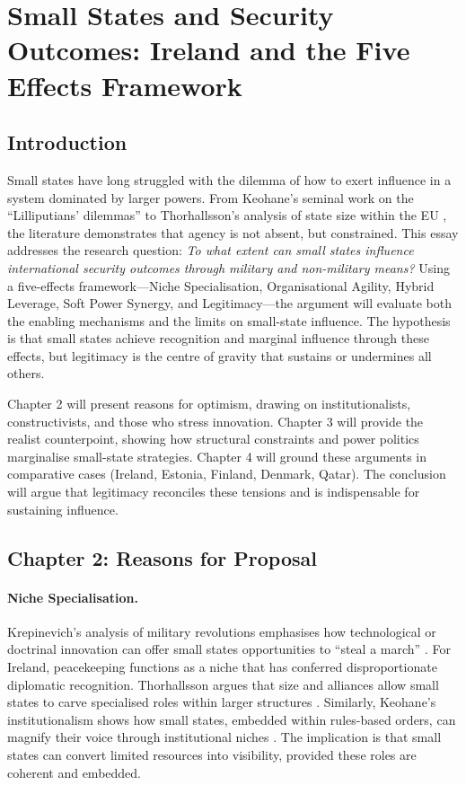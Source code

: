 \section*{Small States and Security Outcomes: Ireland and the Five Effects Framework}

\subsection*{Introduction}
Small states have long struggled with the dilemma of how to exert influence in a system dominated by larger powers. From Keohane’s seminal work on the “Lilliputians’ dilemmas” \parencite{KEOHANE_1969} to Thorhallsson’s analysis of state size within the EU \parencite{THORHALLSSON_2006}, the literature demonstrates that agency is not absent, but constrained. This essay addresses the research question: \textit{To what extent can small states influence international security outcomes through military and non-military means?} Using a five-effects framework—Niche Specialisation, Organisational Agility, Hybrid Leverage, Soft Power Synergy, and Legitimacy—the argument will evaluate both the enabling mechanisms and the limits on small-state influence. The hypothesis is that small states achieve recognition and marginal influence through these effects, but legitimacy is the centre of gravity that sustains or undermines all others.  \parencite{ROTHSTEIN_1966}

Chapter 2 will present reasons for optimism, drawing on institutionalists, constructivists, and those who stress innovation. Chapter 3 will provide the realist counterpoint, showing how structural constraints and power politics marginalise small-state strategies. Chapter 4 will ground these arguments in comparative cases (Ireland, Estonia, Finland, Denmark, Qatar). The conclusion will argue that legitimacy reconciles these tensions and is indispensable for sustaining influence.

\subsection*{Chapter 2: Reasons for Proposal}
\paragraph{Niche Specialisation.}  
Krepinevich’s analysis of military revolutions emphasises how technological or doctrinal innovation can offer small states opportunities to “steal a march” \parencite{KREPINEVICH_1994}. For Ireland, peacekeeping functions as a niche that has conferred disproportionate diplomatic recognition. Thorhallsson argues that size and alliances allow small states to carve specialised roles within larger structures \parencite{THORHALLSSON_2006}. Similarly, Keohane’s institutionalism shows how small states, embedded within rules-based orders, can magnify their voice through institutional niches \parencite{KEOHANE_1988}. The implication is that small states can convert limited resources into visibility, provided these roles are coherent and embedded.

